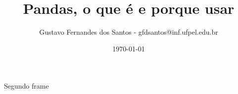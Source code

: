 \documentclass[aspectratio=169]{beamer}
\title[\sc{Texto no rodap\'e}]{Pandas, o que é e porque usar}
\author[Gustavo Santos]{Gustavo Fernandes dos Santos - gfdsantos@inf.ufpel.edu.br}
\institute{UFPEL - Universidade Federal de Pelotas} %
\date{\today}
\begin{document}
\begin{frame}
  \titlepage
\end{frame}

\begin{frame}
Segundo frame
\end{frame}
\end{document}
